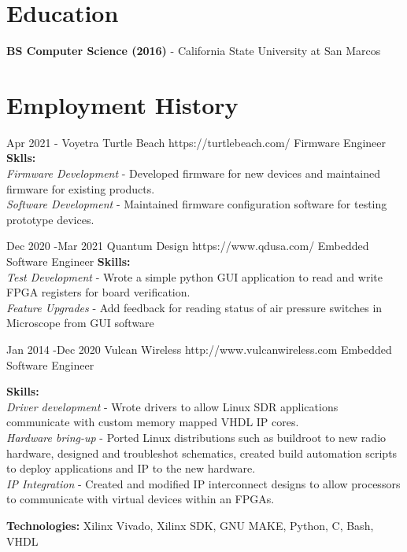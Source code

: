 \documentclass[10pt]{article} %
\begin{document}
\section{Education}

\textbf{BS Computer Science (2016)} - California State University at San Marcos




\section{Employment History}

\job
{Apr 2021 -}
{Voyetra Turtle Beach}
{https://turtlebeach.com/}
{Firmware Engineer}
{\textbf{Sklls:}\\
\textit{Firmware Development} - Developed firmware for new devices and maintained firmware for existing products. \\
\textit{Software Development} - Maintained firmware configuration software for testing prototype devices. \\
}

\job
{Dec 2020 -}{Mar 2021}
{Quantum Design}
{https://www.qdusa.com/}
{Embedded Software Engineer}
{\textbf{Skills:}\\
\textit{Test Development} - Wrote a simple python GUI application to read and write FPGA registers for board verification. \\
\textit{Feature Upgrades} - Add feedback for reading status of air pressure switches in Microscope from GUI software \\
}

\job
{Jan 2014 -}{Dec 2020}
{Vulcan Wireless}
{http://www.vulcanwireless.com}
{Embedded Software Engineer}
{\textbf{Skills:}\\
\textit{Driver development} - Wrote drivers to allow Linux SDR applications communicate with custom memory mapped VHDL IP cores. \\
\textit{Hardware bring-up} - Ported Linux distributions such as buildroot to new radio hardware, designed and troubleshot schematics, created build automation scripts to deploy applications and IP to the new hardware.\\
\textit{IP Integration} - Created and modified IP interconnect designs to allow processors to communicate with virtual devices within an FPGAs.\\
\rule{0mm}{5mm}\textbf{Technologies:} Xilinx Vivado, Xilinx SDK, GNU MAKE, Python, C, Bash, VHDL}
\end{document}
